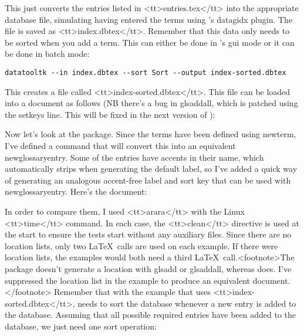 

   This just converts the entries listed in <tt>entries.tex</tt>
   into the appropriate database file, simulating having entered
   the terms using 's datagidx plugin. The file is saved
   as <tt>index.dbtex</tt>. Remember that this data only needs
   to be sorted when you add a term. This can either be done
   in 's \gls{gui} mode or it can be done in batch mode:

\begin{verbatim}
datatooltk --in index.dbtex --sort Sort --output index-sorted.dbtex
\end{verbatim}

   This creates a file called <tt>index-sorted.dbtex</tt>.
   This file can be loaded into a document as follows (NB there's a bug in 
   \gls{glsaddall}, which is patched using the \gls{setkeys} line. This will be fixed in the next version of ):



   Now let's look at the  package. Since the terms
   have been defined using \gls{newterm}, I've defined a command
   that will convert this into an equivalent \gls{newglossaryentry}.
   Some of the entries have accents in their name, which
    automatically strips when generating the default 
   label, so I've added a quick way of generating an
   analogous accent-free label and sort key that can be used with \gls{newglossaryentry}. Here's the document:



   In order to compare them, I used <tt>arara</tt> with 
   the Linux <tt>time</tt> command. In each case, the <tt>clean</tt>
   directive is used at the start to ensure the tests start without
   any auxiliary files. Since there are no location lists, only
   two \LaTeX\ calls are used on each example. If there were
   location lists, the  examples would both
   need a third \LaTeX\ call.<footnote>The 
   package doesn't generate a location with \gls{glsadd}
   or \gls{glsaddall}, whereas  does.
   I've suppressed the location list in the 
   example to produce an equivalent document.</footnote>
   Remember that with the example that uses <tt>index-sorted.dbtex</tt>,
    needs to sort the database whenever a new entry is 
   added to the database. Assuming that all possible required
   entries have been added to the database, we just need one
   sort operation:

